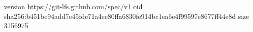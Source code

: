 version https://git-lfs.github.com/spec/v1
oid sha256:b451be94add7e45fde71a4ee80ffa6830fe914bc1ea6e4f99597e8677ff44e8d
size 3156975
